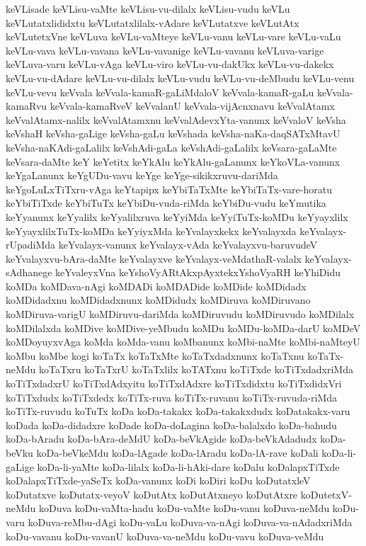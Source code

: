 {keVLisade
keVLisu-vaMte
keVLisu-vu-dilalx
keVLisu-vudu
keVLu
keVLutatxlididxtu
keVLutatxlilalx-vAdare
keVLutatxve
keVLutAtx
keVLutetxVne
keVLuva
keVLu-vaMteye
keVLu-vanu
keVLu-vare
keVLu-vaLu
keVLu-vava
keVLu-vavana
keVLu-vavanige
keVLu-vavanu
keVLuva-varige
keVLuva-varu
keVLu-vAga
keVLu-viro
keVLu-vu-dakUkx
keVLu-vu-dakekx
keVLu-vu-dAdare
keVLu-vu-dilalx
keVLu-vudu
keVLu-vu-deMbudu
keVLu-venu
keVLu-vevu
keVvala
keVvala-kamaR-gaLiMdaloV
keVvala-kamaR-gaLu
keVvala-kamaRvu
keVvala-kamaRveV
keVvalanU
keVvala-vijAcnxnavu
keVvalAtamx
keVvalAtamx-nalilx
keVvalAtamxnu
keVvalAdevxYta-vanunx
keVvaloV
keVsha
keVshaH
keVsha-gaLige
keVsha-gaLu
keVshada
keVsha-naKa-daqSATxMtavU
keVsha-naKAdi-gaLalilx
keVshAdi-gaLa
keVshAdi-gaLalilx
keVsara-gaLaMte
keVsara-daMte
keY
keYetitx
keYkAlu
keYkAlu-gaLanunx
keYkoVLa-vanunx
keYgaLanunx
keYgUDu-vavu
keYge
keYge-sikikxruvu-dariMda
keYgoLuLxTiTxru-vAga
keYtapipx
keYbiTaTxMte
keYbiTaTx-vare-horatu
keYbiTiTxde
keYbiTuTx
keYbiDu-vuda-riMda
keYbiDu-vudu
keYmutika
keYyanunx
keYyalilx
keYyalilxruva
keYyiMda
keYyiTuTx-koMDu
keYyayxlilx
keYyayxlilxTuTx-koMDa
keYyiyxMda
keYvalayxkekx
keYvalayxda
keYvalayx-rUpadiMda
keYvalayx-vanunx
keYvalayx-vAda
keYvalayxvu-baruvudeV
keYvalayxvu-bAra-daMte
keYvalayxve
keYvalayx-veMdathaR-valalx
keYvalayx-sAdhanege
keYvaleyxVna
keYshoVyARtAkxpAyxtekxYshoVyaRH
keYhiDidu
koMDa
koMDava-nAgi
koMDADi
koMDADide
koMDide
koMDidadx
koMDidadxnu
koMDidadxnunx
koMDidudx
koMDiruva
koMDiruvano
koMDiruva-varigU
koMDiruvu-dariMda
koMDiruvudu
koMDiruvudo
koMDilalx
koMDilalxda
koMDive
koMDive-yeMbudu
koMDu
koMDu-koMDa-darU
koMDeV
koMDoyuyxvAga
koMda
koMda-vanu
koMbanunx
koMbi-naMte
koMbi-naMteyU
koMbu
koMbe
kogi
koTaTx
koTaTxMte
koTaTxdadxnunx
koTaTxnu
koTaTx-neMdu
koTaTxru
koTaTxrU
koTaTxlilx
koTATxnu
koTiTxde
koTiTxdadxriMda
koTiTxdadxrU
koTiTxdAdxyitu
koTiTxdAdxre
koTiTxdidxtu
koTiTxdidxVri
koTiTxdudx
koTiTxdedx
koTiTx-ruva
koTiTx-ruvanu
koTiTx-ruvuda-riMda
koTiTx-ruvudu
koTuTx
koDa
koDa-takakx
koDa-takakxdudx
koDatakakx-varu
koDada
koDa-didadxre
koDade
koDa-doLagina
koDa-balalxdo
koDa-bahudu
koDa-bAradu
koDa-bAra-deMdU
koDa-beVkAgide
koDa-beVkAdadudx
koDa-beVku
koDa-beVkeMdu
koDa-lAgade
koDa-lAradu
koDa-lA-rave
koDali
koDa-li-gaLige
koDa-li-yaMte
koDa-lilalx
koDa-li-hAki-dare
koDalu
koDalapxTiTxde
koDalapxTiTxde-yaSeTx
koDa-vanunx
koDi
koDiri
koDu
koDutatxleV
koDutatxve
koDutatx-veyoV
koDutAtx
koDutAtxneyo
koDutAtxre
koDutetxV-neMdu
koDuva
koDu-vaMta-hadu
koDu-vaMte
koDu-vanu
koDuva-neMdu
koDu-varu
koDuva-reMbu-dAgi
koDu-vaLu
koDuva-va-nAgi
koDuva-va-nAdadxriMda
koDu-vavanu
koDu-vavanU
koDuva-va-neMdu
koDu-vavu
koDuva-veMdu
}
